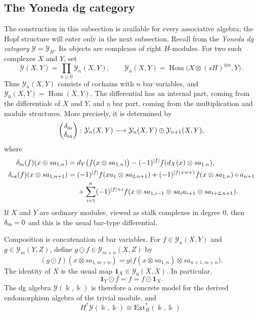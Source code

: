 \documentclass[a4paper, 11pt]{amsart}
\theoremstyle{definition}
\theoremstyle{remark}
\numberwithin{equation}{section}
\newcommand{\Ext}{\mathrm{Ext}}
\newcommand{\Y}{\mathcal{Y}}
\newcommand{\id}{\mathbf{1}}
\begin{document}
\subsection{The Yoneda dg category}
The construction in this subsection is available for every associative algebra; the Hopf structure will enter only in the next subsection. Recall from \cite{ChWa} the \emph{Yoneda dg category} $\mathcal{Y}=\mathcal{Y}_H$. Its objects are complexes of right $H$-modules. For two such complexes $X$ and $Y$, set
\[
\mathcal{Y}(X,Y)=\prod_{n\geq0}\mathcal{Y}_n(X,Y),
\qquad
\mathcal{Y}_n(X,Y)=\operatorname{Hom}\bigl(X\otimes(sH)^{\otimes n},Y\bigr).
\]
Thus $\mathcal{Y}_n(X,Y)$ consists of cochains with $n$ bar variables, and $\mathcal{Y}_0(X,Y)=\operatorname{Hom}(X,Y)$. The differential has an internal part, coming from the differentials of $X$ and $Y$, and a bar part, coming from the multiplication and module structures. More precisely, it is determined by
\[
\begin{pmatrix}\delta_{\rm in}\\
\delta_{\rm ex}\end{pmatrix}
\colon \mathcal{Y}_n(X,Y)
\longrightarrow
\mathcal{Y}_n(X,Y)\oplus\mathcal{Y}_{n+1}(X,Y),
\]
where
\begin{equation}\label{deltayoneda1}
\begin{aligned}
\delta_{\rm in}(f)(x \otimes sa_{1,n}) ={} & d_Y\bigl(f(x \otimes sa_{1,n})\bigr)-(-1)^{|f|}f(d_X(x) \otimes sa_{1,n}),\\
\delta_{\rm ex}(f)(x\otimes sa_{1,n+1}) ={} & (-1)^{|f|}f(x a_1\otimes sa_{2,n+1})+(-1)^{|f|+n+1}f(x\otimes sa_{1,n})\circ a_{n+1}\\
&+\sum_{i=1}^{n}(-1)^{|f|+i} f(x\otimes sa_{1,i-1}\otimes sa_ia_{i+1}\otimes sa_{i+2,n+1}).
\end{aligned}
\end{equation}
If $X$ and $Y$ are ordinary modules, viewed as stalk complexes in degree $0$, then $\delta_{\rm in}=0$ and this is the usual bar-type differential.

Composition is concatenation of bar variables. For $f\in\mathcal{Y}_n(X,Y)$ and $g\in\mathcal{Y}_m(Y,Z)$, define $g\odot f\in\mathcal{Y}_{m+n}(X,Z)$ by
\begin{equation}\label{equation:yonedaproduct}
(g\odot f)(x\otimes sa_{1,m+n})
 =g\bigl(f(x\otimes sa_{1,n})\otimes sa_{n+1,m+n}\bigr).
\end{equation}
The identity of $X$ is the usual map $\id_X\in\mathcal{Y}_0(X,X)$. In particular,
\[
\id_Y\odot f=f=f\odot\id_X.
\]
The dg algebra $\Y(\Bbbk,\Bbbk)$ is therefore a concrete model for the derived endomorphism algebra of the trivial module, and
\[
H^*\Y(\Bbbk,\Bbbk)\cong\Ext_H^*(\Bbbk,\Bbbk).
\]
\end{document}
